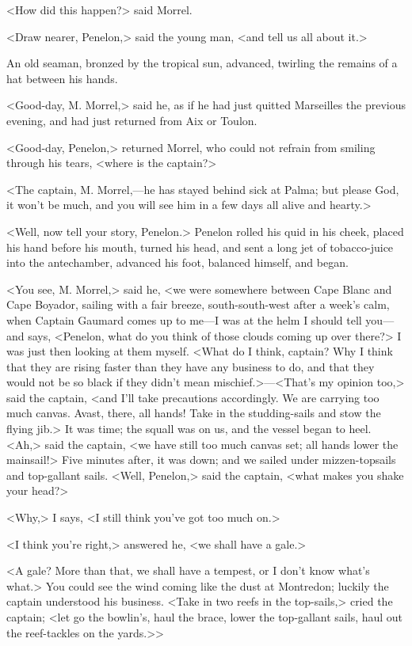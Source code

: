  <How did this happen?> said Morrel. 

 <Draw nearer, Penelon,> said the young man, <and tell us all about it.> 

 An old seaman, bronzed by the tropical sun, advanced, twirling the remains of a hat between his hands. 

 <Good-day, M. Morrel,> said he, as if he had just quitted Marseilles the previous evening, and had just returned from Aix or Toulon. 

 <Good-day, Penelon,> returned Morrel, who could not refrain from smiling through his tears, <where is the captain?> 

 <The captain, M. Morrel,—he has stayed behind sick at Palma; but please God, it won't be much, and you will see him in a few days all alive and hearty.> 

 <Well, now tell your story, Penelon.>  Penelon rolled his quid in his cheek, placed his hand before his mouth, turned his head, and sent a long jet of tobacco-juice into the antechamber, advanced his foot, balanced himself, and began. 

 <You see, M. Morrel,> said he, <we were somewhere between Cape Blanc and Cape Boyador, sailing with a fair breeze, south-south-west after a week's calm, when Captain Gaumard comes up to me—I was at the helm I should tell you—and says, <Penelon, what do you think of those clouds coming up over there?> I was just then looking at them myself. <What do I think, captain? Why I think that they are rising faster than they have any business to do, and that they would not be so black if they didn't mean mischief.>—<That's my opinion too,> said the captain, <and I'll take precautions accordingly. We are carrying too much canvas. Avast, there, all hands! Take in the studding-sails and stow the flying jib.> It was time; the squall was on us, and the vessel began to heel. <Ah,> said the captain, <we have still too much canvas set; all hands lower the mainsail!> Five minutes after, it was down; and we sailed under mizzen-topsails and top-gallant sails. <Well, Penelon,> said the captain, <what makes you shake your head?>

<Why,> I says, <I still think you've got too much on.>

<I think you're right,> answered he, <we shall have a gale.>

<A gale? More than that, we shall have a tempest, or I don't know what's what.> You could see the wind coming like the dust at Montredon; luckily the captain understood his business. <Take in two reefs in the top-sails,> cried the captain; <let go the bowlin's, haul the brace, lower the top-gallant sails, haul out the reef-tackles on the yards.>>

